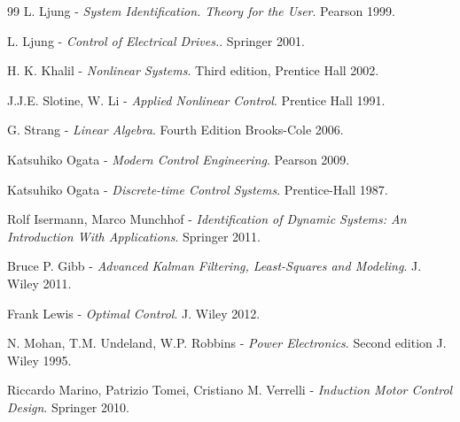 \documentclass[12pt,a4paper,oneside]{book}
\begin{document}
\begin{onehalfspace}
\begin{thebibliography}{99}
	 L. Ljung - \textit{System Identification. Theory for the User}. Pearson 1999.

	 L. Ljung - \textit{Control of Electrical Drives.}. Springer 2001.

	 H. K. Khalil - \textit{Nonlinear Systems}. Third edition, Prentice Hall 2002.
	
	 J.J.E. Slotine, W. Li - \textit{Applied Nonlinear Control}. Prentice Hall 1991.
	
	 G. Strang - \textit{Linear Algebra}. Fourth Edition Brooks-Cole 2006.
	
	 Katsuhiko Ogata - \textit{Modern 
	Control Engineering}. Pearson 2009.	

	 Katsuhiko Ogata - \textit{Discrete-time Control Systems}. Prentice-Hall 1987.
	
	 Rolf Isermann, Marco Munchhof - \textit{Identification of Dynamic Systems: An Introduction With 
		Applications}. Springer 2011.
	
	 Bruce P. Gibb - \textit{Advanced Kalman Filtering, Least-Squares and Modeling}. J. Wiley 2011.
	
	 Frank Lewis - \textit{Optimal Control}. J. Wiley 2012.
	
	 N. Mohan, T.M. Undeland, W.P. Robbins - \textit{Power Electronics}. Second edition J. Wiley 1995.

	 Riccardo Marino, Patrizio Tomei, Cristiano M. Verrelli - \textit{Induction Motor Control Design}. Springer 2010.

\end{thebibliography}
\end{onehalfspace}
\end{document}
